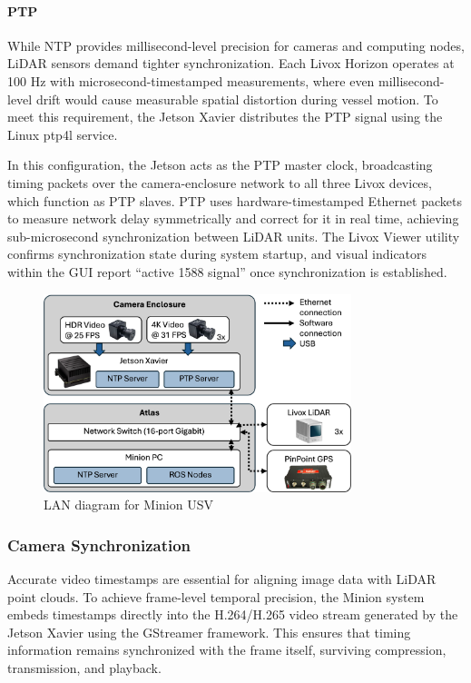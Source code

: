 \documentclass{erauthesis}
\begin{document}
\paragraph{PTP}
While \ac{NTP} provides millisecond-level precision for cameras and computing nodes, LiDAR sensors demand tighter synchronization. Each Livox Horizon operates at 100 Hz with microsecond-timestamped measurements, where even millisecond-level drift would cause measurable spatial distortion during vessel motion. To meet this requirement, the Jetson Xavier distributes the \ac{PTP} signal using the Linux ptp4l service.

In this configuration, the Jetson acts as the \ac{PTP} master clock, broadcasting timing packets over the camera-enclosure network to all three Livox devices, which function as \ac{PTP} slaves. \ac{PTP} uses hardware-timestamped Ethernet packets to measure network delay symmetrically and correct for it in real time, achieving sub-microsecond synchronization between LiDAR units. The Livox Viewer utility confirms synchronization state during system startup, and visual indicators within the GUI report “active 1588 signal” once synchronization is established.

\begin{figure}[htbp]
\centering
\includegraphics[width=0.8\textwidth]{Images/network_diagram2.png}
\caption{LAN diagram for Minion USV}
\label{fig:network_sync}
\end{figure}

\subsubsection{Camera Synchronization} \label{time_sync_cam}

Accurate video timestamps are essential for aligning image data with LiDAR point clouds. To achieve frame-level temporal precision, the Minion system embeds timestamps directly into the H.264/H.265 video stream generated by the Jetson Xavier using the GStreamer framework. This ensures that timing information remains synchronized with the frame itself, surviving compression, transmission, and playback.
\end{document}
